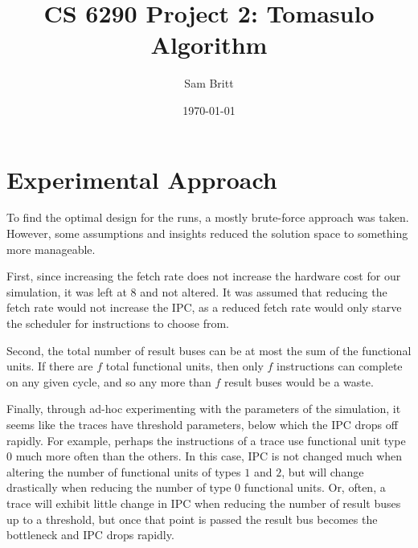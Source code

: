 \documentclass{article}
\title{CS 6290 Project 2: Tomasulo Algorithm}
\author{Sam Britt}
\date{\today}
\begin{document}
  \maketitle

  \section{Experimental Approach}
  \label{sec:experimental_approach}

  To find the optimal design for the runs, a mostly brute-force
  approach was taken. However, some assumptions and insights reduced
  the solution space to something more manageable.

  First, since increasing the fetch rate does not increase the
  hardware cost for our simulation, it was left at $8$ and not
  altered. It was assumed that reducing the fetch rate would not
  increase the IPC, as a reduced fetch rate would only starve the
  scheduler for instructions to choose from.

  Second, the total number of result buses can be at most the sum of
  the functional units. If there are $f$ total functional units, then
  only $f$ instructions can complete on any given cycle, and so any
  more than $f$ result buses would be a waste.

  Finally, through ad-hoc experimenting with the parameters of the
  simulation, it seems like the traces have threshold parameters,
  below which the IPC drops off rapidly. For example, perhaps the
  instructions of a trace use functional unit type $0$ much more often
  than the others. In this case, IPC is not changed much when altering
  the number of functional units of types $1$ and $2$, but will change
  drastically when reducing the number of type $0$ functional units.
  Or, often, a trace will exhibit little change in IPC when reducing
  the number of result buses up to a threshold, but once that point is
  passed the result bus becomes the bottleneck and IPC drops rapidly.
\end{document}
